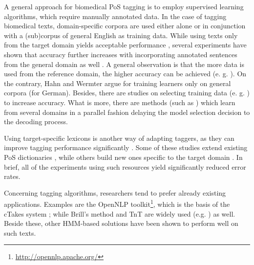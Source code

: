 A general approach for biomedical PoS tagging is to employ supervised learning algorithms, which require manually annotated data. 
In the case of tagging biomedical texts, domain-specific corpora are used either alone \cite{pakhomov2006developing,savova2010mayo,Smith2006} or in conjunction with a (sub)corpus of general English \cite{coden2005domain,ferraro2013improving,miller2007building} as training data. While using texts only from the target domain yields acceptable performance \cite{pakhomov2006developing,savova2010mayo,Smith2006}, 
several experiments have shown that accuracy further increases with incorporating annotated sentences from the general domain as well \cite{barrett2011token,coden2005domain}. A general observation is that the more data is used from the reference domain, the higher accuracy can be achieved (e. g. \cite{pestian2004development}). On the contrary, Hahn and Wermter argue for training learners only on general corpora \cite{hahn2004tagging} (for German). Besides, there are studies on selecting training data (e. g. \cite{liu2007heuristic}) to increase accuracy. What is more, there are methods (such as \cite{choi2012fast}) which learn from several domains in a parallel fashion delaying the model selection decision to the decoding process. 

Using target-specific lexicons is another way of adapting taggers, as they can improve tagging performance significantly \cite{coden2005domain,ruch2000minimal}.  Some of these studies extend existing PoS dictionaries \cite{divita2006dtagger}, while others build new ones specific to the target domain \cite{Smith2006}. In brief, all of the experiments using such resources yield significantly reduced error rates. 

Concerning tagging algorithms, researchers tend to prefer already existing applications. Examples are the OpenNLP toolkit\footnote{\url{http://opennlp.apache.org/}}, which is the basis of the cTakes system \cite{savova2010mayo}; 
while %
Brill’s method \cite{Brill1992} and TnT \cite{Brants2000} are widely used (e.g. \cite{hahn2004tagging,savova2010mayo,pestian2004development}) as well. 
Beside these, other HMM-based solutions have been shown to perform well \cite{barrett2011token,coden2005domain,divita2006dtagger,hahn2004tagging,pakhomov2006developing,rost2008lessons,ruch2000minimal} on such texts. 

